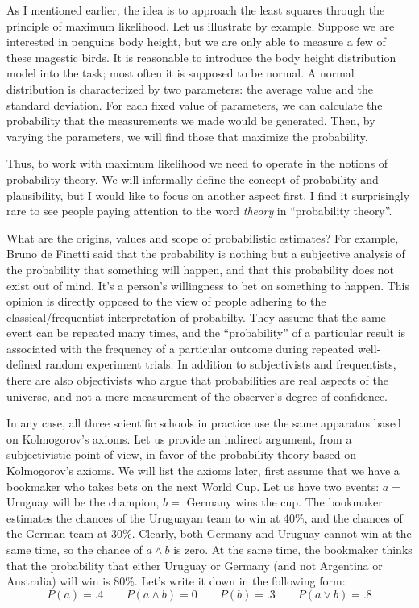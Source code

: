 \documentclass[notitlepage]{report}
\begin{document}
As I mentioned earlier, the idea is to approach the least squares through the principle of maximum likelihood. 
Let us illustrate by example. 
Suppose we are interested in penguins body height, but we are only able to measure a few of these magestic birds.
It is reasonable to introduce the body height distribution model into the task; most often it is supposed to be normal.
A normal distribution is characterized by two parameters: the average value and the standard deviation.
For each fixed value of parameters, we can calculate the probability that the measurements we made would be generated.
Then, by varying the parameters, we will find those that maximize the probability.

Thus, to work with maximum likelihood we need to operate in the notions of probability theory.
We will informally define the concept of probability and plausibility,
but I would like to focus on another aspect first.
I find it surprisingly rare to see people paying attention to the word \textit{theory} in ``probability theory''.

What are the origins, values and scope of probabilistic estimates? 
For example, Bruno de Finetti said that the probability is nothing but a subjective analysis of the probability that something will happen, 
and that this probability does not exist out of mind. 
It's a person's willingness to bet on something to happen. 
This opinion is directly opposed to the view of people adhering to the classical/frequentist interpretation of probabilty.
They assume that the same event can be repeated many times, and the ``probability'' of a particular result is associated with 
the frequency of a particular outcome during repeated well-defined random experiment trials.
In addition to subjectivists and frequentists, there are also objectivists who argue that probabilities are real aspects of the universe, 
and not a mere measurement of the observer's degree of confidence.

In any case, all three scientific schools in practice use the same apparatus based on Kolmogorov's axioms.
Let us provide an indirect argument, from a subjectivistic point of view, in favor of the probability theory based on Kolmogorov's axioms.
We will list the axioms later, first assume that we have a bookmaker who takes bets on the next World Cup. 
Let us have two events: $a=$ Uruguay will be the champion, $b=$ Germany wins the cup.
The bookmaker estimates the chances of the Uruguayan team to win at 40\%, and the chances of the German team at 30\%.
Clearly, both Germany and Uruguay cannot win at the same time, so the chance of $a\wedge b$ is zero. 
At the same time, the bookmaker thinks that the probability that either Uruguay or Germany (and not Argentina or Australia) will win is 80\%.
Let's write it down in the following form:
$$P(a) = .4  \qquad  P(a\wedge b) = 0 \qquad P(b) = .3 \qquad P(a\vee b) = .8$$
	
\end{document}
